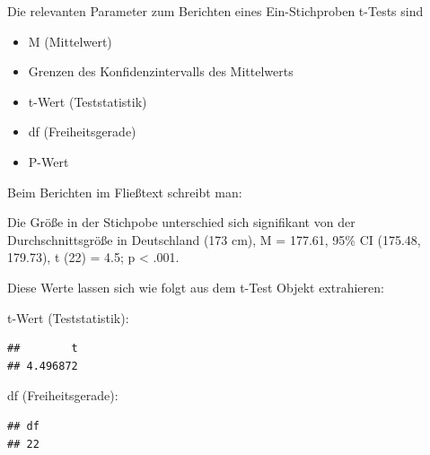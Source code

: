 \documentclass[
]{book}
\newenvironment{Shaded}{\begin{snugshade}}{\end{snugshade}}
\newcommand{\AttributeTok}[1]{\textcolor[rgb]{0.77,0.63,0.00}{#1}}
\newcommand{\DecValTok}[1]{\textcolor[rgb]{0.00,0.00,0.81}{#1}}
\newcommand{\FloatTok}[1]{\textcolor[rgb]{0.00,0.00,0.81}{#1}}
\newcommand{\FunctionTok}[1]{\textcolor[rgb]{0.00,0.00,0.00}{#1}}
\newcommand{\NormalTok}[1]{#1}
\newcommand{\SpecialCharTok}[1]{\textcolor[rgb]{0.00,0.00,0.00}{#1}}
\newcommand{\StringTok}[1]{\textcolor[rgb]{0.31,0.60,0.02}{#1}}
\providecommand{\tightlist}{%
  \setlength{\itemsep}{0pt}\setlength{\parskip}{0pt}}
\begin{document}
Die relevanten Parameter zum Berichten eines Ein-Stichproben t-Tests sind

\begin{itemize}
\tightlist
\item
  M (Mittelwert)
\item
  Grenzen des Konfidenzintervalls des Mittelwerts
\item
  t-Wert (Teststatistik)
\item
  df (Freiheitsgerade)
\item
  P-Wert
\end{itemize}

Beim Berichten im Fließtext schreibt man:

Die Größe in der Stichpobe unterschied sich signifikant von der Durchschnittsgröße in Deutschland (173 cm), M = 177.61, 95\% CI (175.48, 179.73), t (22) = 4.5; p \textless{} .001.

Diese Werte lassen sich wie folgt aus dem t-Test Objekt extrahieren:

t-Wert (Teststatistik):

\begin{Shaded}
\end{Shaded}

\begin{verbatim}
##        t 
## 4.496872
\end{verbatim}

df (Freiheitsgerade):

\begin{Shaded}
\end{Shaded}

\begin{verbatim}
## df 
## 22
\end{verbatim}
\end{document}
